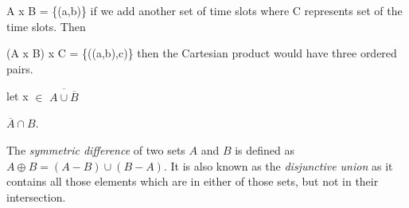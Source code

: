 \documentclass[addpoints]{exam}
\begin{document}
\begin{questions}
\begin{parts}
\begin{solution}
      A x B = \{(a,b)\} if we add another set of time slots where C represents set of the time slots. Then 
      
      (A x B) x C = \{((a,b),c)\} then the Cartesian product would have three ordered pairs. 
    \end{solution}
  \end{parts}
  
  \question
      let x $\in$  $\overline{ A \cup \overline{B}}$

      ${\overline{A} \cap {B}} $.

  The \textit{symmetric difference} of two sets $A$ and $B$ is defined as $A\oplus B = (A-B) \cup (B-A)$. It is also known as the \textit{disjunctive union} as it contains all those elements which are in either of those sets, but not in their intersection. 
\end{questions}
\end{document}
